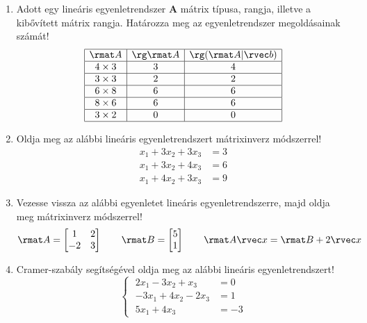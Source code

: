 \documentclass[a4paper, 12pt]{scrartcl}
\begin{document}
\begin{enumerate}

  \item Adott egy lineáris egyenletrendszer $\textbf{A}$ mátrix típusa, rangja,
        illetve a kibővített mátrix rangja. Határozza meg az egyenletrendszer
        megoldásainak számát!
        $$
          \begin{array}{|c|c|c|}
            \hline
            \rmat A  & \rg \rmat A & \rg(\rmat A | \rvec b) \\
            \hline
            4\times3 & 3           & 4                      \\
            \hline
            3\times3 & 2           & 2                      \\
            \hline
            6\times8 & 6           & 6                      \\
            \hline
            8\times6 & 6           & 6                      \\
            \hline
            3\times2 & 0           & 0                      \\
            \hline
          \end{array}
        $$

  \item Oldja meg az alábbi lineáris egyenletrendszert mátrixinverz módszerrel!
        $$
          \begin{aligned}
            x_1 + 3x_2 + 3x_3 & = 3 \\
            x_1 + 3x_2 + 4x_3 & = 6 \\
            x_1 + 4x_2 + 3x_3 & = 9
          \end{aligned}
        $$

  \item Vezesse vissza az alábbi egyenletet lineáris egyenletrendszerre, majd
        oldja meg mátrixinverz módszerrel!
        $$
          \rmat A = \begin{bmatrix}
            1  & 2 \\
            -2 & 3
          \end{bmatrix}
          \qquad
          \rmat B = \begin{bmatrix}
            5 \\
            1
          \end{bmatrix}
          \qquad
          \rmat A \rvec x = \rmat B + 2 \rvec x
        $$

  \item Cramer-szabály segítségével oldja meg az alábbi lineáris
        egyenletrendszert!
        $$
          \left\{\;
          \begin{aligned}
            2x_1 - 3x_2 + x_3   & = 0  \\
            -3x_1 + 4x_2 - 2x_3 & = 1  \\
            5x_1 + 4x_3         & = -3
          \end{aligned}
          \right.
        $$


\end{enumerate}
\end{document}
